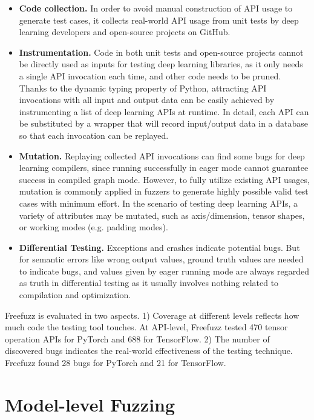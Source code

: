 \documentclass{article}
\begin{document}
\begin{itemize}
    \item \textbf{Code collection.} In order to avoid manual construction of API usage to generate test cases, it collects real-world API usage from unit tests by deep learning developers and open-source projects on GitHub.
    \item \textbf{Instrumentation.} Code in both unit tests and open-source projects cannot be directly used as inputs for testing deep learning libraries, as it only needs a single API invocation each time, and other code needs to be pruned. Thanks to the dynamic typing property of Python, attracting API invocations with all input and output data can be easily achieved by instrumenting a list of deep learning APIs at runtime. In detail, each API can be substituted by a wrapper that will record input/output data in a database so that each invocation can be replayed.
    \item \textbf{Mutation.} Replaying collected API invocations can find some bugs for deep learning compilers, since running successfully in eager mode cannot guarantee success in compiled graph mode. However, to fully utilize existing API usages, mutation is commonly applied in fuzzers to generate highly possible valid test cases with minimum effort. In the scenario of testing deep learning APIs, a variety of attributes may be mutated, such as axis/dimension, tensor shapes, or working modes (e.g. padding modes).
    \item \textbf{Differential Testing.} Exceptions and crashes indicate potential bugs. But for semantic errors like wrong output values, ground truth values are needed to indicate bugs, and values given by eager running mode are always regarded as truth in differential testing as it usually involves nothing related to compilation and optimization.
\end{itemize}

Freefuzz is evaluated in two aspects. 1) Coverage at different levels reflects how much code the testing tool touches. At API-level, Freefuzz tested 470 tensor operation APIs for PyTorch and 688 for TensorFlow. 2) The number of discovered bugs indicates the real-world effectiveness of the testing technique. Freefuzz found 28 bugs for PyTorch and 21 for TensorFlow.

\section{Model-level Fuzzing}
\end{document}
